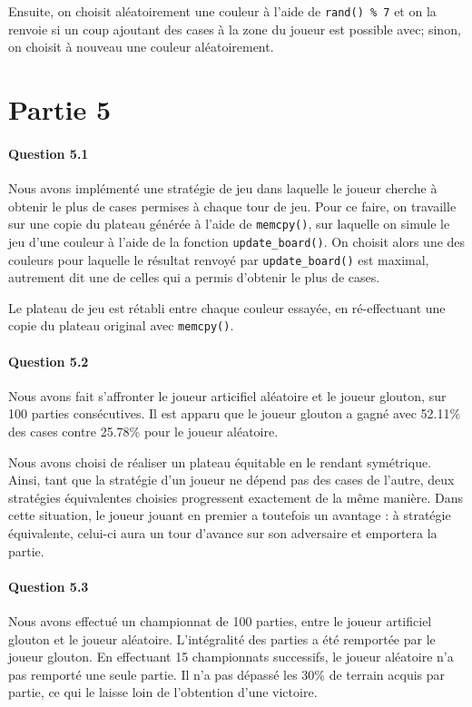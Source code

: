 \documentclass[a4paper]{article}
\begin{document}
Ensuite, on choisit aléatoirement une couleur à l'aide de \texttt{rand() \% 
7} et on la renvoie si un coup ajoutant des cases à la zone du joueur est 
possible avec; sinon, on choisit à nouveau une couleur aléatoirement.

    \section{Partie 5}
    \paragraph{Question 5.1}
    Nous avons implémenté une stratégie de jeu dans laquelle le joueur cherche 
à obtenir le plus de cases permises à chaque tour de jeu. Pour ce faire, on 
travaille sur une copie du plateau générée à l'aide de \texttt{memcpy()}, sur 
laquelle on simule le jeu d'une couleur à l'aide de la fonction 
\texttt{update\_board()}. On choisit alors une des couleurs pour laquelle le 
résultat renvoyé par \texttt{update\_board()} est maximal, autrement dit une de 
celles qui a permis d'obtenir le plus de cases.

Le plateau de jeu est rétabli entre chaque couleur essayée, en ré-effectuant 
une copie du plateau original avec \texttt{memcpy()}.

    \paragraph{Question 5.2}
    Nous avons fait s'affronter le joueur articifiel aléatoire et le joueur 
glouton, sur 100 parties consécutives. Il est apparu que le joueur glouton a 
gagné avec 52.11\% des cases contre 25.78\% pour le joueur aléatoire.

Nous avons choisi de réaliser un plateau équitable en le rendant symétrique. 
Ainsi, tant que la stratégie d'un joueur ne dépend pas des cases de l'autre, 
deux stratégies équivalentes choisies progressent exactement de la même 
manière. Dans cette situation, le joueur jouant en premier a toutefois un 
avantage : à stratégie équivalente, celui-ci aura un tour d'avance sur son 
adversaire et emportera la partie.
    \paragraph{Question 5.3}
    Nous avons effectué un championnat de 100 parties, entre le joueur 
artificiel glouton et le joueur aléatoire. L'intégralité des parties a été 
remportée par le joueur glouton. En effectuant 15 championnats successifs, le 
joueur aléatoire n'a pas remporté une seule partie. Il n'a pas dépassé les 30\% 
de terrain acquis par partie, ce qui le laisse loin de l'obtention d'une 
victoire.
\end{document}
